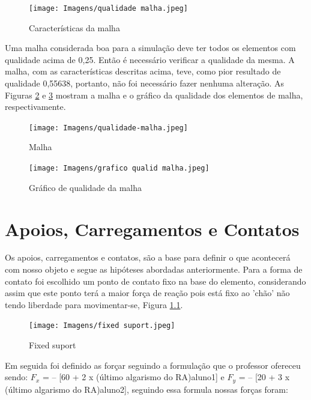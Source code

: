 \documentclass[acronym,symbols]{fei}
\begin{document}
\begin{figure}[!htb]
    \centering
    \caption{Características da malha}
    \texttt{[image: Imagens/qualidade malha.jpeg]}
    \label{fig: malha}
\end{figure}

Uma malha considerada boa para a simulação deve ter todos os elementos com qualidade acima de 0,25. Então é necessário verificar a qualidade da mesma. A malha, com as características descritas acima, teve, como pior resultado de qualidade 0,55638, portanto, não foi necessário fazer nenhuma alteração. As Figuras
\ref{fig: malha colorida} e \ref{fig: grafico malha colorida} mostram a malha e o gráfico da qualidade dos elementos de malha, respectivamente.

\begin{figure}[!htb]
    \centering
    \caption{Malha}
    \texttt{[image: Imagens/qualidade-malha.jpeg]}
    \label{fig: malha colorida}
\end{figure}

\begin{figure}[!htb]
    \centering
    \caption{Gráfico de qualidade da malha}
    \texttt{[image: Imagens/grafico qualid malha.jpeg]}
    \label{fig: grafico malha colorida}
\end{figure}


\chapter{Apoios, Carregamentos e Contatos}

Os apoios, carregamentos e contatos, são a base para definir o que acontecerá com nosso objeto e segue as hipóteses abordadas anteriormente. Para a forma de contato foi escolhido um ponto de contato fixo na base do elemento, considerando assim que este ponto terá a maior força de reação pois está fixo ao 'chão' não tendo liberdade para movimentar-se, Figura \ref{fig: fixed suport}.

\begin{figure}[!htb]
    \centering
    \caption{Fixed suport}
    \texttt{[image: Imagens/fixed suport.jpeg]}
    \label{fig: fixed suport}
\end{figure}

Em seguida foi definido as forçar seguindo a formulação que o professor ofereceu sendo: $F_x$ = – [60 + 2 x (último algarismo do RA)aluno1] e $F_y$ = – [20 + 3 x (último algarismo do RA)aluno2], seguindo essa formula nossas forças foram:
\end{document}
